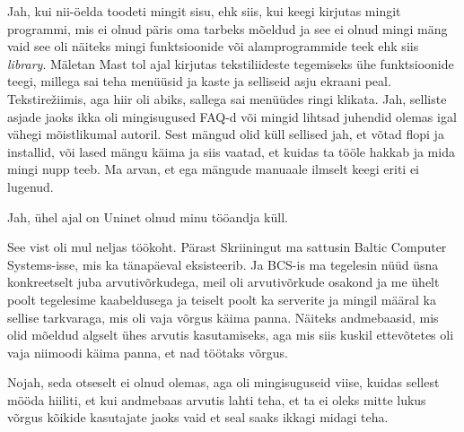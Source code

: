 Jah, kui nii-öelda toodeti mingit sisu, ehk siis, kui keegi kirjutas mingit 
programmi, mis ei olnud  päris oma tarbeks mõeldud ja see ei olnud mingi mäng 
vaid see oli näiteks mingi funktsioonide või alamprogrammide teek ehk siis 
\emph{library}. Mäletan Mast tol ajal kirjutas 
tekstiliideste tegemiseks ühe funktsioonide teegi, millega sai teha menüüsid ja 
kaste ja selliseid asju ekraani peal. Tekstirežiimis, aga hiir oli  abiks, 
sallega sai menüüdes ringi klikata. Jah, selliste asjade jaoks ikka oli 
mingisugused FAQ-d või mingid lihtsad juhendid olemas igal vähegi mõistlikumal 
autoril. Sest mängud olid küll sellised jah, et võtad flopi ja installid, või 
lased mängu käima ja siis vaatad, et kuidas ta tööle hakkab ja mida mingi nupp 
teeb. Ma arvan, et ega mängude manuaale ilmselt keegi eriti ei lugenud.


Jah, ühel ajal on Uninet  olnud minu tööandja küll.


See vist oli mul neljas töökoht. Pärast Skriiningut ma sattusin Baltic 
Computer Systems-isse, mis ka tänapäeval 
eksisteerib. Ja BCS-is ma tegelesin  nüüd üsna konkreetselt juba arvutivõrkudega, 
meil oli arvutivõrkude osakond ja me  ühelt poolt tegelesime 
kaabeldusega ja teiselt poolt  ka serverite ja mingil määral ka sellise 
tarkvaraga, mis  oli vaja võrgus käima panna. Näiteks andmebaasid, mis olid 
mõeldud algselt ühes arvutis kasutamiseks, aga mis siis kuskil ettevõtetes oli 
vaja niimoodi käima panna, et nad töötaks võrgus. 


Nojah, seda otseselt ei olnud olemas, aga oli mingisuguseid viise, kuidas 
sellest mööda hiiliti, et  kui andmebaas arvutis lahti teha, et ta ei oleks 
mitte lukus võrgus kõikide kasutajate jaoks vaid et seal saaks ikkagi midagi 
teha. 


